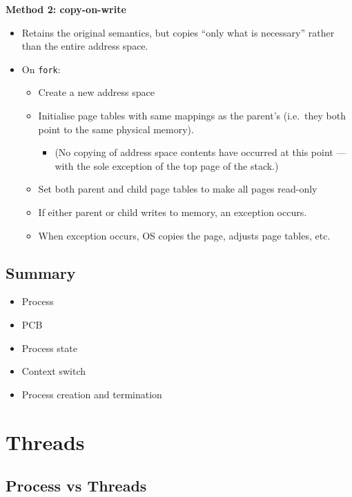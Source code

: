 \documentclass[11pt,a4paper]{article}
\begin{document}
\textbf{Method 2: copy-on-write}
\begin{itemize}
    \item Retains the original semantics, but copies ``only what is necessary'' rather than
        the entire address space.
    \item On \texttt{fork}:
        \begin{itemize}
            \item Create a new address space
            \item Initialise page tables with same mappings as the parent's
                (i.e.\ they both point to the same physical memory).
                \begin{itemize}
                    \item (No copying of address space contents have occurred at this point
                        --- with the sole exception of the top page of the stack.)
                \end{itemize}
            \item Set both parent and child page tables to make all pages read-only
            \item If either parent or child writes to memory, an exception occurs.
            \item When exception occurs, OS copies the page, adjusts page tables, etc.
        \end{itemize}
\end{itemize}

\subsection{Summary}
\begin{itemize}
    \item Process
    \item PCB
    \item Process state
    \item Context switch
    \item Process creation and termination
\end{itemize}

\break{}

\section{Threads}

\subsection{Process vs Threads}
\end{document}
